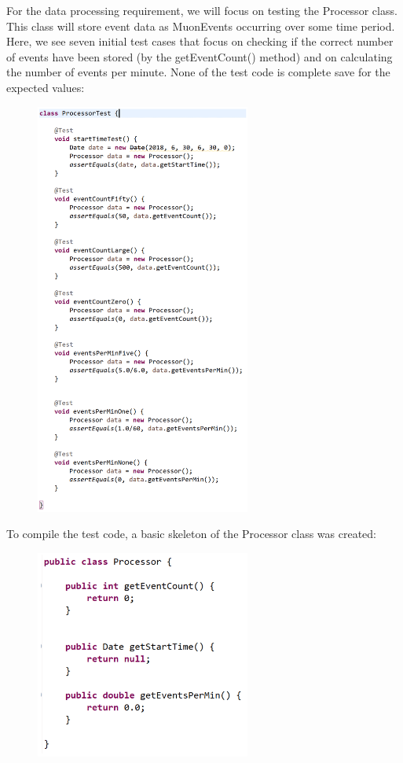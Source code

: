 \documentclass[11pt,a4paper]{article}
\begin{document}
For the data processing requirement, we will focus on testing the Processor class. This class will store event data as MuonEvents occurring over some time period. Here, we see seven initial test cases that focus on checking if the correct number of events have been stored (by the getEventCount() method) and on calculating the number of events per minute. None of the test code is complete save for the expected values:

\begin{figure}[h]
      \includegraphics[width=0.63\textwidth]{codeimg1.png}  
\end{figure}

To compile the test code, a basic skeleton of the Processor class was created:

\begin{figure}[h]
	\includegraphics[width=0.63\textwidth]{codeimg2.png}
\end{figure}
\end{document}
